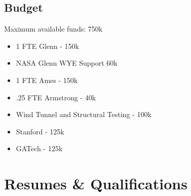 \documentclass[]{aiaa-tc}
\begin{document}
  \begin{landscape}
  \section{Budget}
    Maximum available funds: 750k 
    \begin{itemize}
        \item 1 FTE Glenn - 150k 
        \item NASA Glenn WYE Support 60k 
        \item 1 FTE Ames - 150k 
        \item .25 FTE Armstrong - 40k
        \item Wind Tunnel and Structural Testing - 100k 
        \item Stanford - 125k 
        \item GATech - 125k
    \end{itemize}
    \end{landscape}

  \clearpage
  \section{Resumes \& Qualifications}

    \clearpage
    
    
    \restoregeometry
\end{document}
